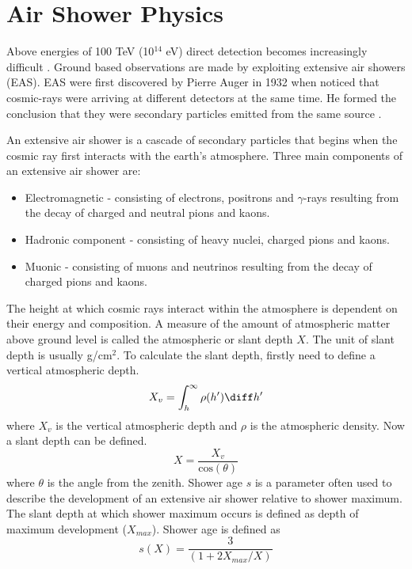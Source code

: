 \chapter{Air Shower Physics}


Above energies of 100 TeV (10$^{14}$ eV) direct detection becomes increasingly difficult \cite{RevModPhys.71.S165}. Ground based observations are made by exploiting extensive air showers (EAS). EAS were first discovered by Pierre Auger in 1932 when noticed that cosmic-rays were arriving at different detectors at the same time. He formed the conclusion that they were secondary particles emitted from the same source \cite{RevModPhys.11.288}.

An extensive air shower is a cascade of secondary particles that begins when the cosmic ray
first interacts with the earth’s atmosphere. Three main components of an extensive air shower are:

\begin{itemize}
\item Electromagnetic - consisting of electrons, positrons and $\gamma$-rays resulting from the decay of charged and neutral pions and kaons.
\item Hadronic component - consisting of heavy nuclei, charged pions and kaons.
\item Muonic - consisting of muons and neutrinos resulting from the decay of charged pions and kaons.
\end{itemize}

The height at which cosmic rays interact within the atmosphere is dependent on their energy and composition. A measure of the amount of atmospheric matter above ground level is called the atmospheric or slant depth $X$. The unit of slant depth is usually g/cm$^2$. To calculate the slant depth, firstly need to define a vertical atmospheric depth.
\begin{equation}
X_v = \int^{\infty}_{h} \rho(h')\diff h'
\end{equation}
where $X_v$ is the vertical atmospheric depth and $\rho$ is the atmospheric density. Now a slant depth can be defined.  
\begin{equation}
X = \frac{X_v}{\mathrm{cos}(\theta)}
\end{equation}
where $\theta$ is the angle from the zenith. Shower age $s$ is a parameter often used to describe the development of an extensive air shower relative to shower maximum. The slant depth at which shower maximum occurs is defined as depth of maximum development ($X_{max}$). Shower age is defined as
\begin{equation}
s(X) = \frac{3}{(1 + 2 X_{max} / X)}
\end{equation}

